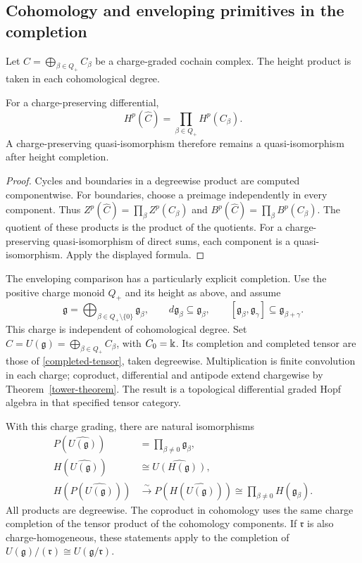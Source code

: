 \subsection{Cohomology and enveloping primitives in the completion}

Let $C=\bigoplus_{\beta\in Q_+}C_\beta$ be a charge-graded cochain
complex. The height product is taken in each cohomological degree.

\begin{proposition}
\label{cohomology-completion}
For a charge-preserving differential,
\[
 H^p(\widehat C)=\prod_{\beta\in Q_+}H^p(C_\beta).
\]
A charge-preserving quasi-isomorphism therefore remains a
quasi-isomorphism after height completion.
\end{proposition}

\begin{proof}
Cycles and boundaries in a degreewise product are computed componentwise.
For boundaries, choose a preimage independently in every component.
Thus $Z^p(\widehat C)=\prod_\beta Z^p(C_\beta)$ and
$B^p(\widehat C)=\prod_\beta B^p(C_\beta)$.
The quotient of these products is the product of the quotients.
For a charge-preserving quasi-isomorphism of direct sums, each component
is a quasi-isomorphism.  Apply the displayed formula.
\end{proof}

The enveloping comparison has a particularly explicit completion.
Use the positive charge monoid $Q_+$ and its height as above, and assume
\[
 \mathfrak g=\bigoplus_{\beta\in Q_+\setminus\{0\}}\mathfrak g_\beta,
 \qquad d\mathfrak g_\beta\subseteq\mathfrak g_\beta,
 \qquad [\mathfrak g_\beta,\mathfrak g_\gamma]
 \subseteq\mathfrak g_{\beta+\gamma}.
\]
This charge is independent of cohomological degree.
Set $C=U(\mathfrak g)=\bigoplus_{\beta\in Q_+}C_\beta$, with $C_0=\Bbbk$.
Its completion and completed tensor are those of
\eqref{completed-tensor}, taken degreewise. Multiplication is finite
convolution in each charge; coproduct, differential and antipode extend
chargewise by Theorem~\ref{tower-theorem}. The result is a topological
differential graded Hopf algebra in that specified tensor category.

\begin{proposition}
\label{sp:completion}
With this charge grading, there are natural isomorphisms
\begin{align*}
 P(\widehat{U(\mathfrak g)})
   &=\prod_{\beta\ne0}\mathfrak g_\beta,\\
 H(\widehat{U(\mathfrak g)})
   &\cong\widehat{U(H(\mathfrak g))},\\
 H(P(\widehat{U(\mathfrak g)}))
   &\xrightarrow{\sim}P(H(\widehat{U(\mathfrak g)}))
    \cong\prod_{\beta\ne0}H(\mathfrak g_\beta).
\end{align*}
All products are degreewise.  The coproduct in cohomology uses the
same charge completion of the tensor product of the cohomology
components.  If $\mathfrak r$ is also charge-homogeneous, these
statements apply to the completion of
$U(\mathfrak g)/(\mathfrak r)\cong U(\mathfrak g/\mathfrak r)$.
\end{proposition}


